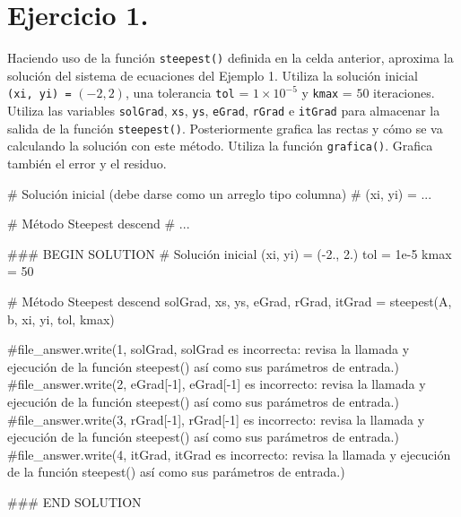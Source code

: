 \documentclass[
  letterpaper,
  DIV=11,
  numbers=noendperiod]{scrreprt}
\newenvironment{Shaded}{\begin{snugshade}}{\end{snugshade}}
\newcommand{\CommentTok}[1]{\textcolor[rgb]{0.37,0.37,0.37}{#1}}
\newcommand{\DecValTok}[1]{\textcolor[rgb]{0.68,0.00,0.00}{#1}}
\newcommand{\FloatTok}[1]{\textcolor[rgb]{0.68,0.00,0.00}{#1}}
\newcommand{\NormalTok}[1]{\textcolor[rgb]{0.00,0.23,0.31}{#1}}
\newcommand{\OperatorTok}[1]{\textcolor[rgb]{0.37,0.37,0.37}{#1}}
\newcommand{\RegionMarkerTok}[1]{\textcolor[rgb]{0.00,0.23,0.31}{#1}}
\begin{document}
\section{\texorpdfstring{\textbf{Ejercicio
1.}}{Ejercicio 1.}}\label{ejercicio-1.-1}

Haciendo uso de la función \texttt{steepest()} definida en la celda
anterior, aproxima la solución del sistema de ecuaciones del Ejemplo 1.
Utiliza la solución inicial \texttt{(xi,\ yi)\ =} \((-2, 2)\), una
tolerancia \texttt{tol} = \(1 \times 10^{-5}\) y \texttt{kmax} = \(50\)
iteraciones. Utiliza las variables \texttt{solGrad}, \texttt{xs},
\texttt{ys}, \texttt{eGrad}, \texttt{rGrad} e \texttt{itGrad} para
almacenar la salida de la función \texttt{steepest()}. Posteriormente
grafica las rectas y cómo se va calculando la solución con este método.
Utiliza la función \texttt{grafica()}. Grafica también el error y el
residuo.

\begin{Shaded}
\begin{Highlighting}[]
\CommentTok{\# Solución inicial (debe darse como un arreglo tipo columna)}
\CommentTok{\# (xi, yi) = ...}

\CommentTok{\# Método Steepest descend}
\CommentTok{\# ...}

\CommentTok{\#\#\# }\RegionMarkerTok{BEGIN}\CommentTok{ SOLUTION}
\CommentTok{\# Solución inicial}
\NormalTok{(xi, yi) }\OperatorTok{=}\NormalTok{ (}\OperatorTok{{-}}\FloatTok{2.}\NormalTok{, }\FloatTok{2.}\NormalTok{)}
\NormalTok{tol }\OperatorTok{=} \FloatTok{1e{-}5}
\NormalTok{kmax }\OperatorTok{=} \DecValTok{50}

\CommentTok{\# Método Steepest descend}
\NormalTok{solGrad, xs, ys, eGrad, rGrad, itGrad  }\OperatorTok{=}\NormalTok{ steepest(A, b, xi, yi, tol, kmax)}

\CommentTok{\#file\_answer.write(\textquotesingle{}1\textquotesingle{}, solGrad, \textquotesingle{}solGrad es incorrecta: revisa la llamada y ejecución de la función steepest() así como sus parámetros de entrada.\textquotesingle{})}
\CommentTok{\#file\_answer.write(\textquotesingle{}2\textquotesingle{}, eGrad[{-}1], \textquotesingle{}eGrad[{-}1] es incorrecto: revisa la llamada y ejecución de la función steepest() así como sus parámetros de entrada.\textquotesingle{})}
\CommentTok{\#file\_answer.write(\textquotesingle{}3\textquotesingle{}, rGrad[{-}1], \textquotesingle{}rGrad[{-}1] es incorrecto: revisa la llamada y ejecución de la función steepest() así como sus parámetros de entrada.\textquotesingle{})}
\CommentTok{\#file\_answer.write(\textquotesingle{}4\textquotesingle{}, itGrad, \textquotesingle{}itGrad es incorrecto: revisa la llamada y ejecución de la función steepest() así como sus parámetros de entrada.\textquotesingle{})}

\CommentTok{\#\#\# }\RegionMarkerTok{END}\CommentTok{ SOLUTION}
\end{Highlighting}
\end{Shaded}
\end{document}
